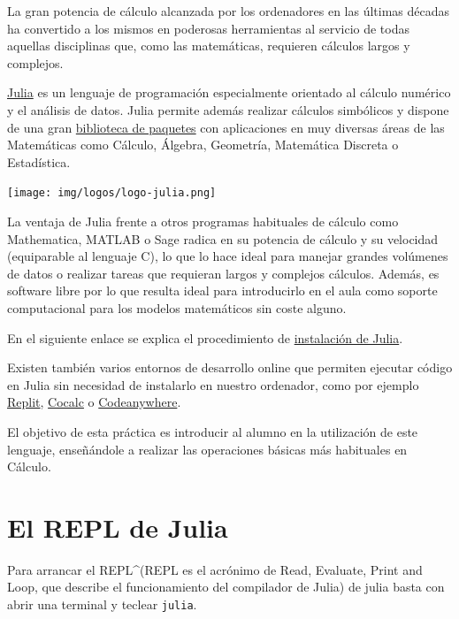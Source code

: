 \documentclass[
  a4paper,
]{scrreport}
\theoremstyle{definition}
\theoremstyle{remark}
\begin{document}
La gran potencia de cálculo alcanzada por los ordenadores en las últimas
décadas ha convertido a los mismos en poderosas herramientas al servicio
de todas aquellas disciplinas que, como las matemáticas, requieren
cálculos largos y complejos.

\href{https://julialang.org/}{Julia} es un lenguaje de programación
especialmente orientado al cálculo numérico y el análisis de datos.
Julia permite además realizar cálculos simbólicos y dispone de una gran
\href{https://julialang.org/packages/}{biblioteca de paquetes} con
aplicaciones en muy diversas áreas de las Matemáticas como Cálculo,
Álgebra, Geometría, Matemática Discreta o Estadística.

\texttt{[image: img/logos/logo-julia.png]}

La ventaja de Julia frente a otros programas habituales de cálculo como
Mathematica, MATLAB o Sage radica en su potencia de cálculo y su
velocidad (equiparable al lenguaje C), lo que lo hace ideal para manejar
grandes volúmenes de datos o realizar tareas que requieran largos y
complejos cálculos. Además, es software libre por lo que resulta ideal
para introducirlo en el aula como soporte computacional para los modelos
matemáticos sin coste alguno.

En el siguiente enlace se explica el procedimiento de
\href{https://aprendeconalf.es/manual-julia/intro.html\#instalaci\%C3\%B3n-de-julia}{instalación
de Julia}.

Existen también varios entornos de desarrollo online que permiten
ejecutar código en Julia sin necesidad de instalarlo en nuestro
ordenador, como por ejemplo
\href{https://replit.com/languages/julia}{Replit},
\href{https://cocalc.com/}{Cocalc} o
\href{https://codeanywhere.com/languages/julia}{Codeanywhere}.

El objetivo de esta práctica es introducir al alumno en la utilización
de este lenguaje, enseñándole a realizar las operaciones básicas más
habituales en Cálculo.

\section{El REPL de Julia}\label{el-repl-de-julia}

Para arrancar el REPL\^{}(REPL es el acrónimo de Read, Evaluate, Print
and Loop, que describe el funcionamiento del compilador de Julia) de
julia basta con abrir una terminal y teclear \texttt{julia}.
\end{document}
